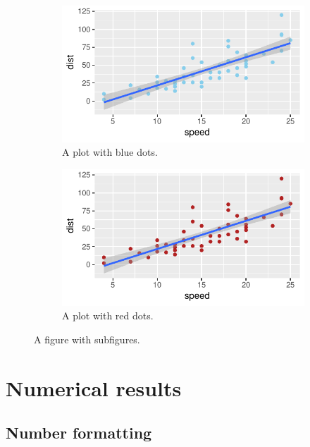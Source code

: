 \documentclass[fleqn,reqno,10pt]{article}
\begin{document}
\begin{figure}[t]
  \centering
  \begin{subfigure}[b]{0.45\textwidth}
        \includegraphics[width=\textwidth]{plots/myplot1.pdf}
        \caption{A plot with blue dots.}
        \label{fig:PlotBlue}
    \end{subfigure}
    \hfill
  \begin{subfigure}[b]{0.45\textwidth}
        \includegraphics[width=\textwidth]{plots/myplot2.pdf}
        \caption{A plot with red dots.}
        \label{fig:PlotRed}
    \end{subfigure}
  \caption{A figure with subfigures.}
  \label{fig:Plot}
\end{figure}

\section*{Numerical results}

\subsection*{Number formatting}
\end{document}
